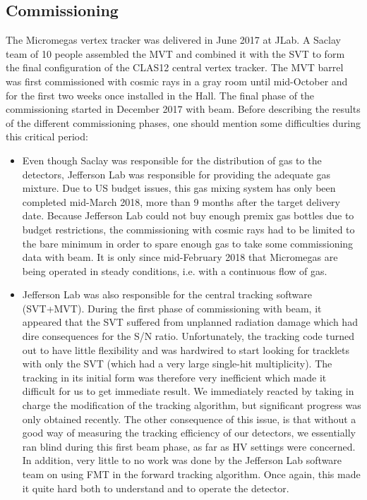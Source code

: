 \subsection{Commissioning}

The Micromegas vertex tracker was delivered in June 2017 at JLab. A Saclay team of 10 people assembled the MVT and combined it with the SVT to form the final configuration of the CLAS12 central vertex tracker.  The MVT barrel was first commissioned with cosmic rays in a gray room until mid-October and for the first two weeks once installed in the Hall. The final phase of the commissioning started in December 2017 with beam. Before describing the results of the different commissioning phases, one should mention some difficulties during this critical period:

\begin{itemize}
 \item Even though Saclay was responsible for the distribution of gas to the detectors, Jefferson Lab was responsible for providing the adequate gas mixture. Due to US budget issues, this gas mixing system has only been completed mid-March 2018, more than 9 months after the target delivery date. Because Jefferson Lab could not buy enough premix gas bottles due to budget restrictions, the commissioning with cosmic rays had to be limited to the bare minimum in order to spare enough gas to take some commissioning data with beam. It is only since mid-February 2018 that Micromegas are being operated in steady conditions, i.e. with a continuous flow of gas.
 
 \item Jefferson Lab was also responsible for the central tracking software (SVT+MVT). During the first phase of commissioning with beam, it appeared that the SVT suffered from unplanned radiation damage which had dire consequences for the S/N ratio. Unfortunately, the tracking code turned out to have little flexibility and was hardwired to start looking for tracklets with only the SVT (which had a very large single-hit multiplicity). The tracking in its initial form was therefore very inefficient which made it difficult for us to get immediate result. We immediately reacted by taking in charge the modification of the tracking algorithm, but significant progress was only obtained recently. The other consequence of this issue, is that without a good way of measuring the tracking efficiency of our detectors, we essentially ran blind during this first beam phase, as far as HV settings were concerned. In addition, very little to no work was done by the Jefferson Lab software team on using FMT in the forward tracking algorithm. Once again, this made it quite hard both to understand and to operate the detector.

\end{itemize}

